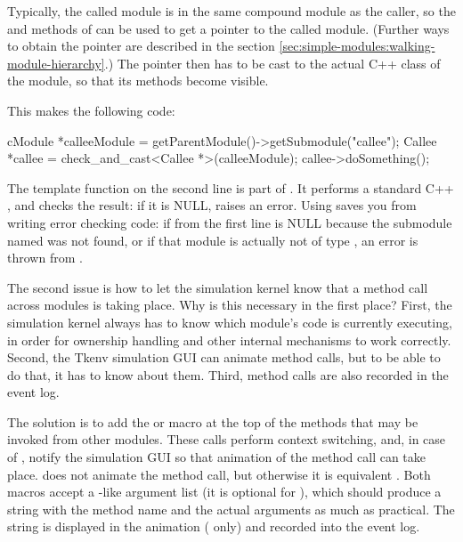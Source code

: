 Typically, the called module is in the same compound module as the caller,
so the  and  methods of
 can be used to get a  pointer to the
called module. (Further ways to obtain the pointer are described
in the section \ref{sec:simple-modules:walking-module-hierarchy}.)
The  pointer then has to be cast to the actual C++ class
of the module, so that its methods become visible.

This makes the following code:

\begin{cpp}
cModule *calleeModule = getParentModule()->getSubmodule("callee");
Callee *callee = check_and_cast<Callee *>(calleeModule);
callee->doSomething();
\end{cpp}

The  template function on the second line
is part of {\opp}. It performs a standard C++ ,
and checks the result: if it is NULL,  raises an {\opp} error.
Using  saves you from writing error checking
code: if  from the first line is NULL because
the submodule named  was not found, or if that
module is actually not of type , an error is thrown
from .

The second issue is how to let the simulation kernel know that
a method call across modules is taking place. Why is this necessary
in the first place? First, the simulation kernel always has to know which
module's code is currently executing, in order for ownership handling
and other internal mechanisms to work correctly. Second, the Tkenv
simulation GUI can animate method calls, but to be able to do that,
it has to know about them. Third, method calls are also recorded
in the event log.

The solution is to add the  or 
macro at the top of the methods that may be invoked from other
modules. These calls perform context switching, and, in case of
, notify the simulation GUI so that animation
of the method call can take place. 
does not animate the method call, but otherwise it is equivalent
. Both macros accept a -like
argument list (it is optional for ),
which should produce a string with the method name and the
actual arguments as much as practical. The string is displayed in
the animation ( only) and recorded into the event log.


